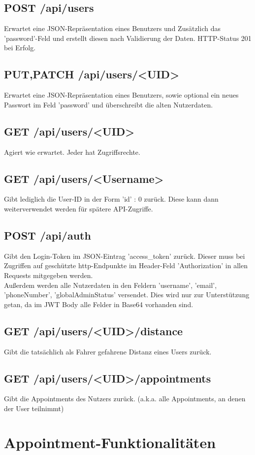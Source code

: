 \documentclass[11pt,a4paper]{article}
\begin{document}
\subsection{\textbf{POST} /api/users}
Erwartet eine JSON-Repräsentation eines Benutzers und Zusätzlich das 'password'-Feld und erstellt diesen nach Validierung der Daten. HTTP-Status 201 bei Erfolg.
\subsection{\textbf{PUT,PATCH} /api/users/<UID>}
Erwartet eine JSON-Repräsentation eines Benutzers, sowie optional ein neues Passwort im Feld 'password' und überschreibt die alten Nutzerdaten.
\subsection{\textbf{GET} /api/users/<UID>}
Agiert wie erwartet. Jeder hat Zugriffsrechte.
\subsection{\textbf{GET} /api/users/<Username>}
Gibt lediglich die User-ID in der Form {'id' : 0} zurück. Diese kann dann weiterverwendet werden für spätere API-Zugriffe.
\subsection{\textbf{POST} /api/auth}
Gibt den Login-Token im JSON-Eintrag 'access\_token' zurück. Dieser muss bei Zugriffen auf geschützte http-Endpunkte im Header-Feld 'Authorization' in allen Requests mitgegeben werden.\\
Außerdem werden alle Nutzerdaten in den Feldern 'username', 'email', 'phoneNumber', 'globalAdminStatus' versendet. Dies wird nur zur Unterstützung getan, da im JWT Body alle Felder in Base64 vorhanden sind.
\subsection{\textbf{GET} /api/users/<UID>/distance}
Gibt die tatsächlich als Fahrer gefahrene Distanz eines Users zurück.
\subsection{\textbf{GET} /api/users/<UID>/appointments}
Gibt die Appointments des Nutzers zurück. (a.k.a. alle Appointments, an denen der User teilnimmt)
\section{Appointment-Funktionalitäten}
\end{document}
